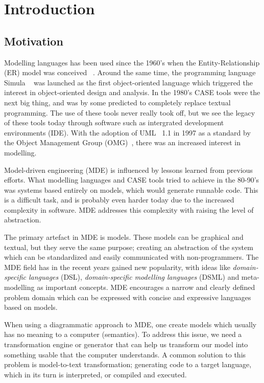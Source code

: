 \chapter{Introduction}

\section{Motivation}
Modelling languages has been used since the 1960's when the Entity-Relationship (ER) model was conceived ~\cite{Chen:1976:EMU:320434.320440}. Around the same time, the programming language Simula ~\cite{Dahl:1966:SAS:365813.365819} was launched as the first object-oriented language which triggered the interest in object-oriented design and analysis. In the 1980's CASE tools were the next big thing, and was by some predicted to completely replace textual programming. The use of these tools never really took off, but we see the legacy of these tools today through software such as intergrated development environments (IDE). With the adoption of UML~\cite{OMG07UML} 1.1 in 1997 as a standard by the Object Management Group (OMG)~\cite{OMG}, there was an increased interest in modelling. 

Model-driven engineering (MDE) is influenced by lessons learned from previous efforts. What modelling languages and CASE tools tried to achieve in the 80-90's was systems based entirely on models, which would generate runnable code. This is a difficult task, and is probably even harder today due to the increased complexity in software. MDE addresses this complexity with raising the level of abstraction.

The primary artefact in MDE is models. These models can be graphical and textual, but they serve the same purpose; creating an abstraction of the system which can be standardized and easily communicated with non-programmers. The MDE field has in the recent years gained new popularity, with ideas like \emph{domain-specific languages} (DSL), \emph{domain-specific modelling languages} (DSML) and meta-modelling as important concepts. MDE encourages a narrow and clearly defined problem domain which can be expressed with concise and expressive languages based on models. 

When using a diagrammatic approach to MDE, one create models which usually has no meaning to a computer (semantics). To address this issue, we need a transformation engine or generator that can help us transform our model into something usable that the computer understands. A common solution to this problem is model-to-text transformation; generating code to a target language, which in its turn is interpreted, or compiled and executed. 

